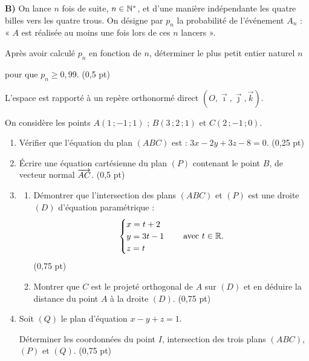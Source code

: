 \noindent\textbf{B)} On lance $n$ fois de suite, $n \in \mathbb{N}^*$, et d'une manière indépendante les quatre billes vers les quatre trous. On désigne par $p_n$ la probabilité de l'événement $A_n$ : « $A$ est réalisée au moins une fois lors de ces $n$ lancers ».

Après avoir calculé $p_n$ en fonction de $n$, déterminer le plus petit entier naturel $n$

pour que $p_n \geqslant 0,99$. \hfill (0,5 pt)




L'espace est rapporté à un repère orthonormé direct $(O,\vec{\imath},\vec{\jmath},\vec{k})$.

On considère les points $A(1\,;-1\,;1)$ ; $B(3\,;2\,;1)$ et $C(2\,;-1\,;0)$.

\begin{enumerate}
	\item Vérifier que l'équation du plan $(ABC)$ est : $3x - 2y + 3z - 8 = 0$. \hfill (0,25 pt)
	\item Écrire une équation cartésienne du plan $(P)$ contenant le point $B$, de vecteur normal $\overrightarrow{AC}$. \hfill (0,5 pt)
	\item
	\begin{enumerate}
		\item Démontrer que l'intersection des plans $(ABC)$ et $(P)$ est une droite $(D)$ d'équation paramétrique :
		$$
		\begin{cases}
			x = t+2 \\
			y = 3t-1 \\
			z = t
		\end{cases}
		\quad \text{avec } t \in \mathbb{R}.
		$$
		\hfill (0,75 pt)
		\item Montrer que $C$ est le projeté orthogonal de $A$ sur $(D)$ et en déduire la distance du point $A$ à la droite $(D)$. \hfill (0,75 pt)
	\end{enumerate}
	\item Soit $(Q)$ le plan d'équation $x - y + z = 1$.

	Déterminer les coordonnées du point $I$, intersection des trois plans $(ABC)$, $(P)$ et $(Q)$. \hfill (0,75 pt)
\end{enumerate}



